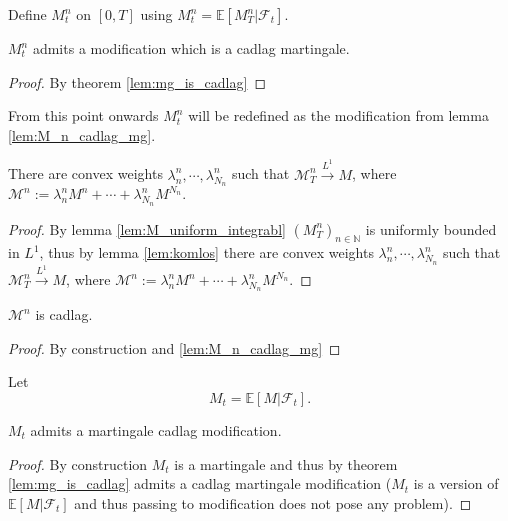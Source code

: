 Define $M^n_t$ on $[0,T]$ using $M^n_t=\mathbb{E}[M^n_T\vert\mathcal{F}_t]$.

\begin{lemma}\label{lem:M_n_cadlag_mg}
  $M^n_t$ admits a modification which is a cadlag martingale.
\end{lemma}
\begin{proof}
  By theorem \ref{lem:mg_is_cadlag}
\end{proof}

From this point onwards $M^n_t$ will be redefined as the modification from lemma \ref{lem:M_n_cadlag_mg}.
\begin{lemma}\label{lem:M_cal_converges_L1}
  There are convex weights $\lambda^n_n,\cdots,\lambda^n_{N_n}$ such that
  $\mathcal{M}^n_T\stackrel{L^1}{\rightarrow}M$, where $\mathcal{M}^n:=\lambda^n_nM^n+\cdots +\lambda^n_{N_n}M^{N_n}.$
\end{lemma}
\begin{proof}
  By lemma \ref{lem:M_uniform_integrabl} $(M^n_T)_{n\in\mathbb{N}}$ is uniformly bounded in $L^1$, thus by lemma \ref{lem:komlos} there are convex weights $\lambda^n_n,\cdots,\lambda^n_{N_n}$ such that
  $\mathcal{M}^n_T\stackrel{L^1}{\rightarrow}M$, where $\mathcal{M}^n:=\lambda^n_nM^n+\cdots +\lambda^n_{N_n}M^{N_n}.$
\end{proof}

\begin{lemma}\label{lem:M_cal_cadlag}
  $\mathcal{M}^n$ is cadlag.
\end{lemma}
\begin{proof}
  By construction and \ref{lem:M_n_cadlag_mg}
\end{proof}

Let \begin{equation}\label{equation_DM_e6} M_t = \mathbb{E}[M\vert\mathcal{F}_t].\end{equation}

\begin{lemma}\label{lem:M_cadlag_mg}
  $M_t$ admits a martingale cadlag modification.
\end{lemma}
\begin{proof}
  By construction $M_t$ is a martingale and thus by theorem \ref{lem:mg_is_cadlag} admits a cadlag martingale modification
  ($M_t$ is a version of $\mathbb{E}[M\vert\mathcal{F}_t]$ and thus passing to modification does not pose any problem).
\end{proof}

